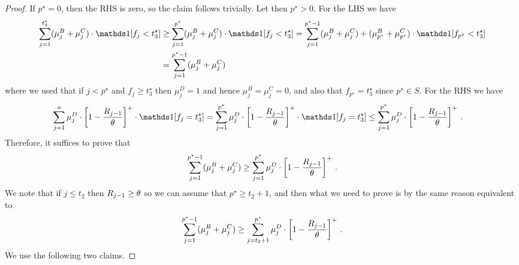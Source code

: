 \begin{proof}
    If $p^\star = 0$, then the RHS is zero, so the claim follows trivially.
    Let then $p^\star > 0$.
    For the LHS we have 
    \begin{align*}
    \sum_{j=1}^{t_3^\star}(\mu_j^B+\mu_j^C)\cdot \ind[f_j<t_3^\star]
    &\geq \sum_{j=1}^{p^\star} (\mu_j^B+\mu_j^C)\cdot \ind[f_j<t_3^\star]
    = \sum_{j=1}^{p^\star - 1} (\mu_j^B+\mu_j^C) + (\mu_{p^\star}^B + \mu_{p^\star}^C) \cdot \ind[f_{p^\star} < t_3^\star]\\
    &= \sum_{j=1}^{p^\star - 1} (\mu_j^B+\mu_j^C)
    \end{align*}
    where we used that if $j < p^\star$ and $f_j \geq t_3^\star$ then $\mu_j^D = 1$ and hence $\mu_j^B = \mu_j^C = 0$, and also that $f_{p^\star} = t_3^\star$ since $p^\star \in S$.
    For the RHS we have
    \begin{align*}
    \sum_{j=1}^n \mu_j^D \cdot\left[1 -\frac{R_{j-1}}{\MRttwo}\right]^+ \cdot \ind[f_j=t_3^\star]
    &= \sum_{j=1}^{p^\star} \mu_j^D \cdot\left[1 -\frac{R_{j-1}}{\MRttwo}\right]^+ \cdot \ind[f_j=t_3^\star]
    \leq \sum_{j=1}^{p^\star} \mu_j^D \cdot\left[1 -\frac{R_{j-1}}{\MRttwo}\right]^+\,.
    \end{align*}
    Therefore, it suffices to prove that 
    \[\sum_{j=1}^{p^\star - 1} (\mu_j^B+\mu_j^C) \geq \sum_{j=1}^{p^\star} \mu_j^D \cdot\left[1 -\frac{R_{j-1}}{\theta}\right]^+\,.\]
    We note that if $j \leq t_2$ then $R_{j-1} \geq \theta$ so we can assume that $p^\star \geq t_2 + 1$, and then what we need to prove is by the same reason equivalent to
    \[\sum_{j=1}^{p^\star - 1} (\mu_j^B+\mu_j^C) \geq \sum_{j=t_2+1}^{p^\star} \mu_j^D \cdot\left[1 -\frac{R_{j-1}}{\theta}\right]^+\,.\]
    We use the following two claims.
    

\end{proof}

